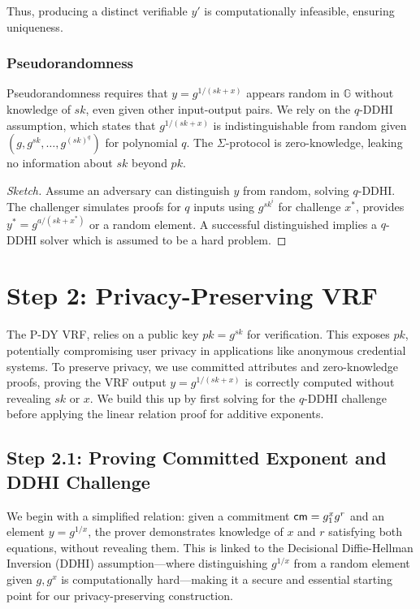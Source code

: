 Thus, producing a distinct verifiable $y'$ is computationally infeasible, ensuring uniqueness.

\subsubsection{Pseudorandomness}

Pseudorandomness requires that $y = g^{1/(sk + x)}$ appears random in $\mathbb{G}$ without knowledge of $sk$, even given other input-output pairs. We rely on the $q$-DDHI assumption, which states that $g^{1/(sk + x)}$ is indistinguishable from random given $(g, g^{sk}, \ldots, g^{(sk)^q})$ for polynomial $q$. 
The $\Sigma$-protocol is zero-knowledge, leaking no information about $sk$ beyond $pk$.

\begin{proof}[Sketch]
    Assume an adversary can distinguish $y$ from random, solving $q$-DDHI. The challenger simulates proofs for $q$ inputs using $g^{sk^i}$ for challenge $x^*$, provides $y^* = g^{a/(sk + x^*)}$ or a random element. A successful distinguished implies a $q$-DDHI solver which is assumed to be a hard problem.
\end{proof}





\newpage
\section{Step 2: Privacy-Preserving VRF}

The P-DY VRF, relies on a public key $pk = g^{sk}$ for verification. This exposes $pk$, potentially compromising user privacy in applications like anonymous credential systems. To preserve privacy, we use committed attributes and zero-knowledge proofs, proving the VRF output $y = g^{1/(sk + x)}$ is correctly computed without revealing $sk$ or $x$. We build this up by first solving for the $q$-DDHI challenge before applying the linear relation proof for additive exponents. 

\subsection{Step 2.1: Proving Committed Exponent and DDHI Challenge}

We begin with a simplified relation: given a commitment $\mathsf{cm} = g_1^x g^r$ and an element $y = g^{1/x}$, the prover demonstrates knowledge of $x$ and $r$ satisfying both equations, without revealing them. This is linked to the Decisional Diffie-Hellman Inversion (DDHI) assumption—where distinguishing $g^{1/x}$ from a random element given $g, g^x$ is computationally hard—making it a secure and essential starting point for our privacy-preserving construction.

